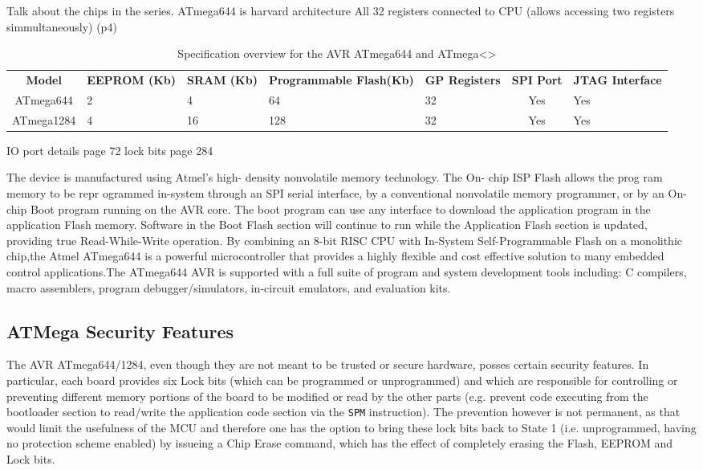 \documentclass[12pt,a4paper,twocolumn]{article}
\begin{document}
	Talk about the chips in the series.
	ATmega644 is harvard architecture \cite{atmega644_manual}
	All 32 registers connected to CPU (allows accessing two registers simmultaneously) (p4)
	\begin{table}
		\begin{tabular}{| c | p{2cm} | p{1.5cm} | p{3cm} | p{2.8cm} | c | p{1.9cm} |}
		\textbf{Model} & \textbf{EEPROM (Kb)} & \textbf{SRAM (Kb)} & \textbf{Programmable Flash(Kb)} & \textbf{GP Registers} & \textbf{SPI Port} & \textbf{JTAG Interface}\\
		ATmega644 & 2 & 4 & 64 & 32 & Yes & Yes\\
		ATmega1284 & 4 & 16 & 128 & 32 & Yes & Yes \\
		
		
		\end{tabular}
	\caption{Specification overview for the AVR ATmega644 and ATmega<>}
	\label{table:avr_specs}
	\end{table}
	
	IO port details page 72
	lock bits page 284
	
	
The device is manufactured using Atmel’s high-
density nonvolatile memory technology. The On-
chip ISP Flash allows the prog
ram memory to be repr
ogrammed in-system through an SPI serial interface, by a conventional nonvolatile memory programmer, or by an On-chip Boot program
running on the AVR core. The boot program can
use any interface to download the application
program in the application Flash memory. Software in the Boot
Flash section will continue to run
while the Application Flash section is updated,
providing true Read-While-Write operation. By
combining an 8-bit RISC CPU with In-System Self-Programmable Flash on a monolithic chip,the Atmel ATmega644 is a powerful microcontroller that provides a highly flexible and cost effective solution to many embedded control applications.The ATmega644 AVR is supported with a full suite of program and system development tools including: C compilers, macro assemblers, program debugger/simulators, in-circuit emulators,
and evaluation kits.	
	
	\subsection{ATMega Security Features}
	
	The AVR ATmega644/1284, even though they are not meant to be trusted or secure hardware, posses certain security features. In particular, each board provides six Lock bits (which can be programmed or unprogrammed) and which are responsible for controlling or preventing different memory portions of the board to be modified or read by the other parts (e.g. prevent code executing from the bootloader section to read/write the application code section via the \texttt{SPM} instruction). The prevention however is not permanent, as that would limit the usefulness of the MCU and therefore one has the option to bring these lock bits back to State 1 (i.e. unprogrammed, having no protection scheme enabled) by issueing a Chip Erase command, which has the effect of completely erasing the Flash, EEPROM and Lock bits.
	
\end{document}
